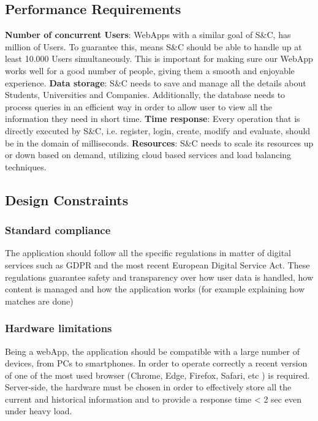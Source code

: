 \documentclass{article}
\begin{document}
\subsection{Performance Requirements}
\textbf{Number of concurrent Users}: WebApps with a similar goal of S\&C, has million of Users. To guarantee this, means S\&C should be able to handle up at least 10.000 Users simultaneously. This is important for making sure our WebApp works well for a good number of people, giving them a smooth and enjoyable experience.\newline
\textbf{Data storage}: S\&C needs to save and manage all the details about Students, Universities and Companies. Additionally, the database needs to process queries in an efficient way in order to allow user to view all the information they need in short time.\newline
\textbf{Time response}: Every operation that is directly executed by S\&C, i.e. register, login, create, modify and evaluate, should be in the domain of milliseconds.\newline
\textbf{Resources}: S\&C needs to scale its resources up or down based on demand, utilizing cloud based services and load balancing techniques.

\subsection{Design Constraints}
\subsubsection{Standard compliance}
The application should follow all the specific regulations in matter of digital services such as GDPR and the most recent European Digital Service Act. These regulations guarantee safety and transparency over how user data is handled, how content is managed and how the application works (for example explaining how matches are done)
\subsubsection{Hardware limitations}
Being a webApp, the application should be compatible with a large number of devices, from PCs to smartphones. In order to operate correctly a recent version of one of the most used browser (Chrome, Edge, Firefox, Safari, etc ) is required.
Server-side, the hardware must be chosen in order to effectively store all the current and historical information and to provide a response time < 2 sec even under heavy load.
\end{document}
